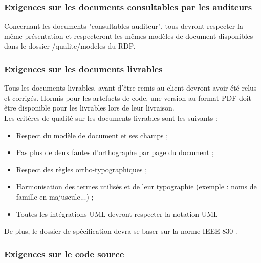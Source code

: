 \documentclass[a4paper,11pt,titlepage]{article}
\begin{document}
\subsubsection{Exigences sur les documents consultables par les auditeurs}
Concernant les documents "consultables auditeur", tous devront respecter
la même présentation et respecteront les mêmes modèles de document
disponibles dans le dossier /qualite/modeles du RDP.

\subsubsection{Exigences sur les documents livrables}
Tous les documents livrables, avant d'être remis au client devront avoir
été relus et corrigés. Hormis pour les artefacts de code, une version au format PDF
doit être disponible pour les livrables lors de leur livraison.\\
Les critères de qualité sur les documents livrables sont les suivants :
\begin{itemize}
    \item Respect du modèle de document et ses champs ;
    \item Pas plus de deux fautes d'orthographe par page du document ;
    \item Respect des règles ortho-typographiques ;
    \item Harmonisation des termes utilisés et de leur typographie (exemple : noms de famille en majuscule...) ;
    \item Toutes les intégrations UML devront respecter la notation UML \cite[UML\_2.5.1\_2017]{UML}
\end{itemize}

De plus, le dossier de spécification devra se baser sur la norme IEEE 830 \cite[IEEE\_1998]{830}.

\subsubsection{Exigences sur le code source}
\end{document}
